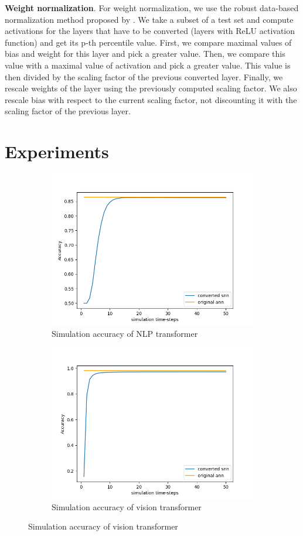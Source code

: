 \documentclass{article}
\begin{document}
\textbf{Weight normalization}. For weight normalization, we use the robust data-based normalization method proposed by \cite{rueckauer2016theory}. We take a subset of a test set and compute activations for the layers that have to be converted (layers with ReLU activation function) and get its p-th percentile value. First, we compare maximal values of bias and weight for this layer and pick a greater value. Then, we compare this value with a maximal value of activation and pick a greater value. This value is then divided by the scaling factor of the previous converted layer. Finally, we rescale weights of the layer using the previously computed scaling factor. We also rescale bias with respect to the current scaling factor, not discounting it with the scaling factor of the previous layer.

\section{Experiments}

\begin{figure}
\centering
    \begin{subfigure}
      \centering
      \includegraphics[width=0.7\linewidth]{assets_simulated_accuracy_nlp_v2.png}
      \caption[width=.4\linewidth]{Simulation accuracy of NLP transformer}
      \label{fig:sub1}
    \end{subfigure}
    \begin{subfigure}
      \centering
      \includegraphics[width=0.7\linewidth]{assets_simulated_accuracy_vit_v2.png}
      \caption{Simulation accuracy of vision transformer}
      \label{fig:sub2}
    \end{subfigure}
\label{fig:test}
\end{figure}
\end{document}
